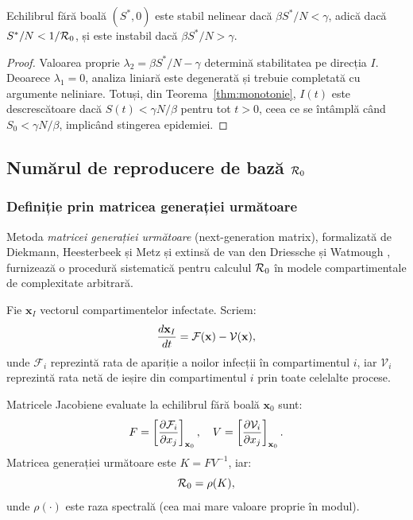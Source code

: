 \begin{teorema}
\label{thm:stabilitate_dfe}
Echilibrul fără boală $(S^*, 0)$ este stabil nelinear dacă
$\beta S^*/N < \gamma$, adică dacă $S^*/N < 1/\mathcal{R}_0$, și este instabil dacă
$\beta S^*/N > \gamma$.
\end{teorema}

\begin{proof}
Valoarea proprie $\lambda_2 = \beta S^*/N - \gamma$ determină stabilitatea pe
direcția $I$. Deoarece $\lambda_1 = 0$, analiza liniară este degenerată și
trebuie completată cu argumente neliniare. Totuși, din Teorema~\ref{thm:monotonie},
$I(t)$ este descrescătoare dacă $S(t) < \gamma N/\beta$ pentru tot $t > 0$, ceea
ce se întâmplă când $S_0 < \gamma N/\beta$, implicând stingerea epidemiei.
\end{proof}

\subsection{Numărul de reproducere de bază \texorpdfstring{$\mathcal{R}_0$}{R0}}
\label{subsec:R0}

\subsubsection{Definiție prin matricea generației următoare}

Metoda \emph{matricei generației următoare} (next-generation matrix), formalizată
de Diekmann, Heesterbeek și Metz \cite{diekmann1990} și extinsă de
van den Driessche și Watmough \cite{vandendriesschwatmough2002},
furnizează o procedură sistematică pentru calculul $\mathcal{R}_0$ în modele
compartimentale de complexitate arbitrară.

Fie $\mathbf{x}_I$ vectorul compartimentelor infectate. Scriem:
\begin{equation}
    \frac{d\mathbf{x}_I}{dt} = \mathcal{F}(\mathbf{x}) - \mathcal{V}(\mathbf{x}),
\end{equation}
unde $\mathcal{F}_i$ reprezintă rata de apariție a noilor infecții în
compartimentul $i$, iar $\mathcal{V}_i$ reprezintă rata netă de ieșire
din compartimentul $i$ prin toate celelalte procese.

Matricele Jacobiene evaluate la echilibrul fără boală $\mathbf{x}_0$ sunt:
\begin{equation}
    F = \left[\frac{\partial \mathcal{F}_i}{\partial x_j}\right]_{\mathbf{x}_0}, \quad
    V = \left[\frac{\partial \mathcal{V}_i}{\partial x_j}\right]_{\mathbf{x}_0}.
\end{equation}
Matricea generației următoare este $K = FV^{-1}$, iar:
\begin{equation}
\label{eq:R0_def}
    \mathcal{R}_0 = \rho(K),
\end{equation}
unde $\rho(\cdot)$ este raza spectrală (cea mai mare valoare proprie în modul).

